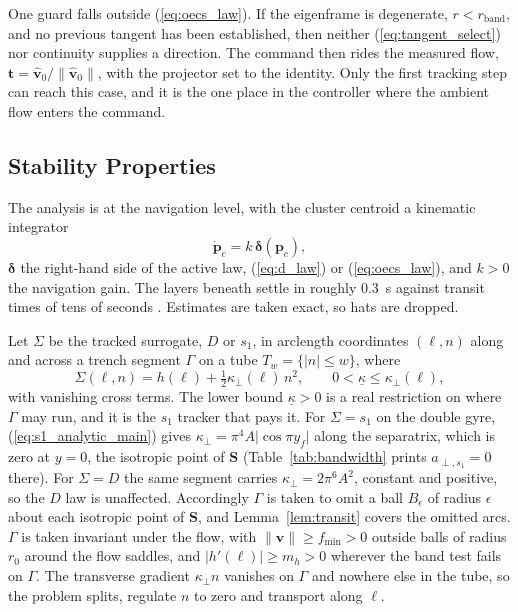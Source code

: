 \documentclass[lettersize,journal]{IEEEtran}
\begin{document}
One guard falls outside (\ref{eq:oecs_law}). If the eigenframe is
degenerate, $r < r_{\mathrm{band}}$, and no previous tangent has been
established, then neither (\ref{eq:tangent_select}) nor continuity
supplies a direction. The command then rides the measured flow,
$\mathbf{t} = \hat{\mathbf{v}}_0/\|\hat{\mathbf{v}}_0\|$, with the
projector set to the identity. Only the first tracking step can reach
this case, and it is the one place in the controller where the ambient
flow enters the command.



\subsection{Stability Properties}
\label{sec:stability}

The analysis is at the navigation level, with the cluster centroid a
kinematic integrator
\begin{equation}
    \dot{\mathbf{p}}_c = k\,\boldsymbol{\delta}(\mathbf{p}_c),
    \label{eq:kinematic_model}
\end{equation}
$\boldsymbol{\delta}$ the right-hand side of the active law,
(\ref{eq:d_law}) or (\ref{eq:oecs_law}), and $k > 0$ the navigation
gain. The layers beneath settle in roughly 0.3~s against transit times
of tens of seconds \cite{9}. Estimates are taken exact, so hats are
dropped.

Let $\Sigma$ be the tracked surrogate, $D$ or $s_1$, in arclength
coordinates $(\ell, n)$ along and across a trench segment $\Gamma$ on a
tube $T_w = \{|n| \leq w\}$, where
\begin{equation}
    \Sigma(\ell, n) = h(\ell)
        + \tfrac{1}{2}\kappa_\perp(\ell)\,n^2,
    \qquad 0 < \underline{\kappa} \leq \kappa_\perp(\ell),
    \label{eq:normal_form}
\end{equation}
with vanishing cross terms. The lower bound $\underline{\kappa} > 0$ is
a real restriction on where $\Gamma$ may run, and it is the $s_1$
tracker that pays it. For $\Sigma = s_1$ on the double gyre,
(\ref{eq:s1_analytic_main}) gives $\kappa_{\perp} = \pi^4 A
\lvert\cos \pi y_f\rvert$ along the separatrix, which is zero at
$y = 0$, the isotropic point of $\mathbf{S}$ (Table~\ref{tab:bandwidth}
prints $a_{\perp,s_1} = 0$ there). For $\Sigma = D$ the same segment
carries $\kappa_\perp = 2\pi^6 A^2$, constant and positive, so the $D$
law is unaffected. Accordingly $\Gamma$ is taken to omit a ball
$B_\epsilon$ of radius $\epsilon$ about each isotropic point of
$\mathbf{S}$, and Lemma~\ref{lem:transit} covers the omitted arcs.
$\Gamma$ is taken invariant under the flow,
with $\lVert\mathbf{v}\rVert \geq f_{\min} > 0$ outside balls of radius
$r_0$ around the flow saddles, and $|h'(\ell)| \geq m_h > 0$ wherever
the band test fails on $\Gamma$. The transverse gradient $\kappa_\perp
n$ vanishes on $\Gamma$ and nowhere else in the tube, so the problem
splits, regulate $n$ to zero and transport along $\ell$.
\end{document}
